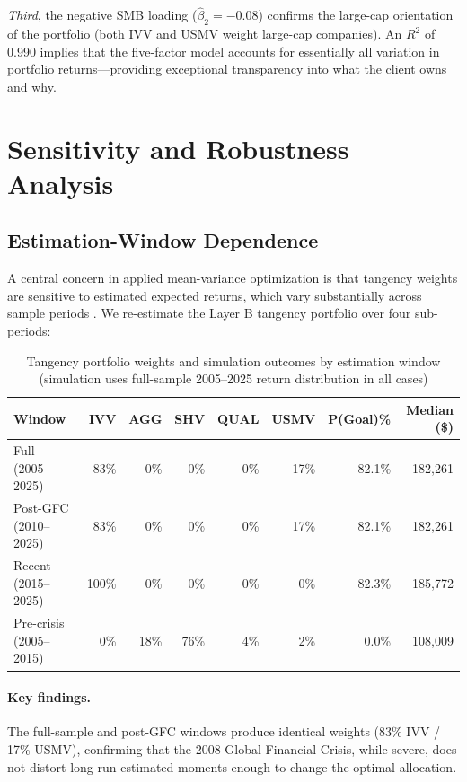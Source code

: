 \documentclass[12pt, letterpaper]{article}
\begin{document}
\textit{Third}, the negative SMB loading ($\hat{\beta}_2 = -0.08$) confirms the
large-cap orientation of the portfolio (both IVV and USMV weight large-cap companies).
An $R^2$ of 0.990 implies that the five-factor model accounts for essentially all variation
in portfolio returns---providing exceptional transparency into what the client owns and why.

\section{Sensitivity and Robustness Analysis}
\label{sec:sensitivity}

\subsection{Estimation-Window Dependence}

A central concern in applied mean-variance optimization is that tangency weights
are sensitive to estimated expected returns, which vary substantially across sample
periods \citep{michaud1989}.  We re-estimate the Layer B tangency portfolio over
four sub-periods:

\begin{table}[H]
  \centering
  \caption{Tangency portfolio weights and simulation outcomes by estimation window
           (simulation uses full-sample 2005--2025 return distribution in all cases)}
  \label{tab:sensitivity}
  \small
  \begin{tabular}{lrrrrrrr}
    \toprule
    \textbf{Window} & \textbf{IVV} & \textbf{AGG} & \textbf{SHV} & \textbf{QUAL}
                    & \textbf{USMV} & \textbf{P(Goal)\%} & \textbf{Median (\$)} \\
    \midrule
    Full (2005--2025)      & 83\% &  0\% &  0\% & 0\% & 17\% & 82.1\% & 182{,}261 \\
    Post-GFC (2010--2025)  & 83\% &  0\% &  0\% & 0\% & 17\% & 82.1\% & 182{,}261 \\
    Recent (2015--2025)    &100\% &  0\% &  0\% & 0\% &  0\% & 82.3\% & 185{,}772 \\
    Pre-crisis (2005--2015)&  0\% & 18\% & 76\% & 4\% &  2\% &  0.0\% & 108{,}009 \\
    \bottomrule
  \end{tabular}
\end{table}

\paragraph{Key findings.}
The full-sample and post-GFC windows produce identical weights (83\% IVV / 17\% USMV),
confirming that the 2008 Global Financial Crisis, while severe, does not distort
long-run estimated moments enough to change the optimal allocation.
\end{document}
